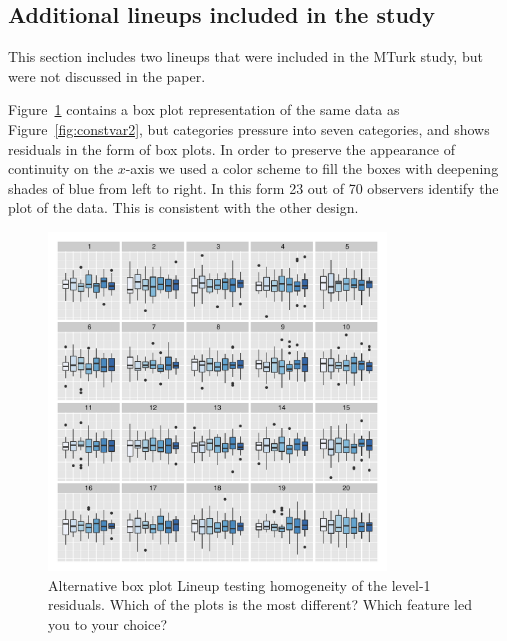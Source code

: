 \documentclass[12pt]{article} %
\begin{document}
\subsection{Additional lineups included in the study}\label{app:morelineups}

This section includes two lineups that were included in the  MTurk study, but were not discussed in the paper. 

Figure~\ref{fig:constvar2.bp} contains a box plot representation of the same data as Figure~\ref{fig:constvar2}, but categories pressure into seven categories, and shows residuals in the form of box plots. In order to preserve the appearance of continuity on the $x$-axis we used a color scheme to fill the boxes with deepening shades of blue from left to right. In this form 23 out of 70 observers identify the plot of the data.  This is consistent with the other design.

\begin{figure}[hbt]
	\centering
	\includegraphics[width=0.8\textwidth]{dialyzerheterogeneous-bp-19.pdf}
	\caption{\label{fig:constvar2.bp} 
	Alternative box plot  Lineup testing homogeneity of the level-1 residuals. Which of the plots is the most different? Which feature led you to your choice?}
\end{figure}
\end{document}
